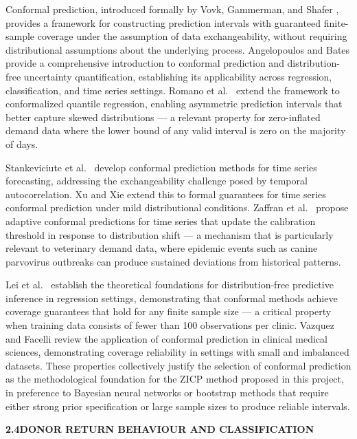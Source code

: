 \documentclass[12pt,a4paper]{article}
\begin{document}
\noindent Conformal prediction, introduced formally by Vovk, Gammerman, and Shafer \cite{vovk2005}, provides a framework for constructing prediction intervals with guaranteed finite-sample coverage under the assumption of data exchangeability, without requiring distributional assumptions about the underlying process. Angelopoulos and Bates \cite{angelopoulos2021} provide a comprehensive introduction to conformal prediction and distribution-free uncertainty quantification, establishing its applicability across regression, classification, and time series settings. Romano et al.\ \cite{romano2019} extend the framework to conformalized quantile regression, enabling asymmetric prediction intervals that better capture skewed distributions — a relevant property for zero-inflated demand data where the lower bound of any valid interval is zero on the majority of days.

\noindent Stankeviciute et al.\ \cite{stankeviciute2021} develop conformal prediction methods for time series forecasting, addressing the exchangeability challenge posed by temporal autocorrelation. Xu and Xie \cite{xu2023} extend this to formal guarantees for time series conformal prediction under mild distributional conditions. Zaffran et al.\ \cite{zaffran2022} propose adaptive conformal predictions for time series that update the calibration threshold in response to distribution shift — a mechanism that is particularly relevant to veterinary demand data, where epidemic events such as canine parvovirus outbreaks can produce sustained deviations from historical patterns.

\noindent Lei et al.\ \cite{lei2018} establish the theoretical foundations for distribution-free predictive inference in regression settings, demonstrating that conformal methods achieve coverage guarantees that hold for any finite sample size — a critical property when training data consists of fewer than 100 observations per clinic. Vazquez and Facelli \cite{vazquez2022} review the application of conformal prediction in clinical medical sciences, demonstrating coverage reliability in settings with small and imbalanced datasets. These properties collectively justify the selection of conformal prediction as the methodological foundation for the ZICP method proposed in this project, in preference to Bayesian neural networks or bootstrap methods that require either strong prior specification or large sample sizes to produce reliable intervals.

\vspace{2em}
\noindent\textbf{2.4\quad DONOR RETURN BEHAVIOUR AND CLASSIFICATION}
\vspace{0.8em}
\end{document}
